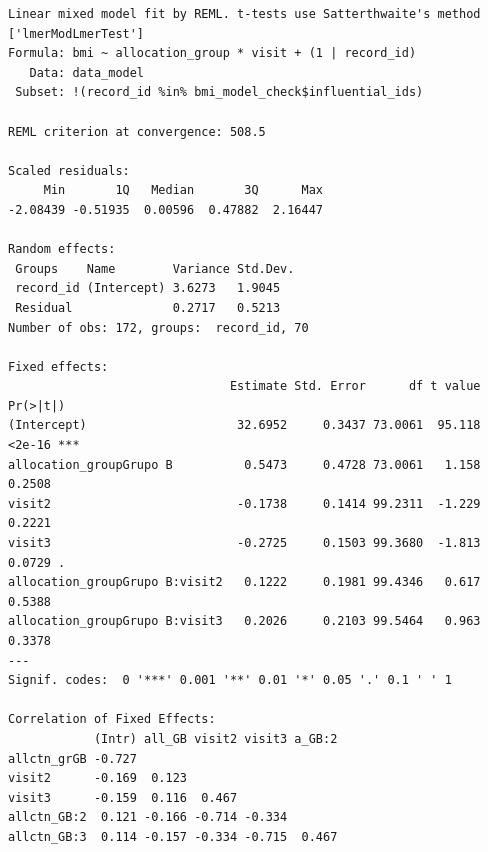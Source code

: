 \documentclass[
  12pt,
]{article}
\newenvironment{Shaded}{\begin{snugshade}}{\end{snugshade}}
\newcommand{\NormalTok}[1]{\textcolor[rgb]{0.00,0.23,0.31}{#1}}
\newcommand{\SpecialCharTok}[1]{\textcolor[rgb]{0.37,0.37,0.37}{#1}}
\begin{document}
\begin{verbatim}
Linear mixed model fit by REML. t-tests use Satterthwaite's method ['lmerModLmerTest']
Formula: bmi ~ allocation_group * visit + (1 | record_id)
   Data: data_model
 Subset: !(record_id %in% bmi_model_check$influential_ids)

REML criterion at convergence: 508.5

Scaled residuals: 
     Min       1Q   Median       3Q      Max 
-2.08439 -0.51935  0.00596  0.47882  2.16447 

Random effects:
 Groups    Name        Variance Std.Dev.
 record_id (Intercept) 3.6273   1.9045  
 Residual              0.2717   0.5213  
Number of obs: 172, groups:  record_id, 70

Fixed effects:
                               Estimate Std. Error      df t value Pr(>|t|)    
(Intercept)                     32.6952     0.3437 73.0061  95.118   <2e-16 ***
allocation_groupGrupo B          0.5473     0.4728 73.0061   1.158   0.2508    
visit2                          -0.1738     0.1414 99.2311  -1.229   0.2221    
visit3                          -0.2725     0.1503 99.3680  -1.813   0.0729 .  
allocation_groupGrupo B:visit2   0.1222     0.1981 99.4346   0.617   0.5388    
allocation_groupGrupo B:visit3   0.2026     0.2103 99.5464   0.963   0.3378    
---
Signif. codes:  0 '***' 0.001 '**' 0.01 '*' 0.05 '.' 0.1 ' ' 1

Correlation of Fixed Effects:
            (Intr) all_GB visit2 visit3 a_GB:2
allctn_grGB -0.727                            
visit2      -0.169  0.123                     
visit3      -0.159  0.116  0.467              
allctn_GB:2  0.121 -0.166 -0.714 -0.334       
allctn_GB:3  0.114 -0.157 -0.334 -0.715  0.467
\end{verbatim}

\begin{Shaded}
\end{Shaded}
\end{document}
